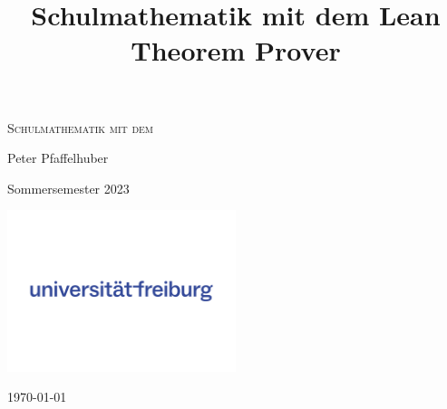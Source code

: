 \documentclass[11pt]{article}
\begin{document}
\begin{titlepage}
	\centering
	{\scshape\LARGE Schulmathematik mit dem \par} 
	\vspace{1.5cm}
	\par\vspace{1cm}
	\vspace{1cm}
	\vspace{2cm}
	{\Large Peter Pfaffelhuber}\par
	{\Large Sommersemester 2023}\par
	\vspace{0.5cm}
	\vfill
        \parbox[b]{0.5\textwidth}{\includegraphics[width=0.5\textwidth]{UFR-vorlage-designsystem-typo-farben-V1.92.png}\vspace*{-7ex}\mbox{} } \hspace{0cm}
	\vfill
	{\large \today\par} %
\end{titlepage}

\title{Schulmathematik mit dem Lean Theorem Prover}\date{}
\maketitle
\tableofcontents %

\newpage

\setcounter{section}{-1}
\end{document}
